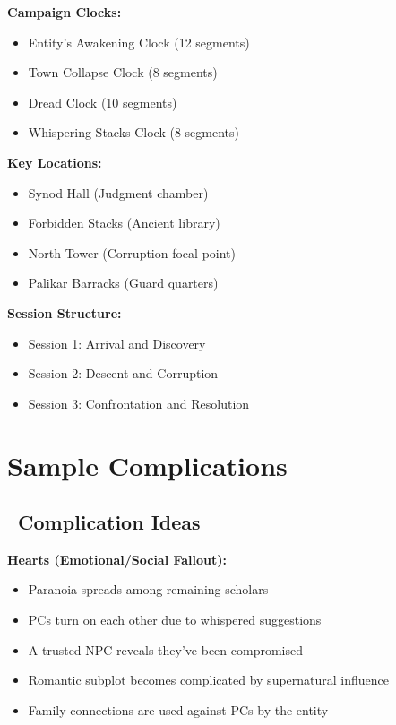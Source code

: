 \documentclass[11pt]{article}
\begin{document}
\textbf{Campaign Clocks:}
\begin{itemize}
    \item Entity's Awakening Clock (12 segments)
    \item Town Collapse Clock (8 segments)
    \item Dread Clock (10 segments)
    \item Whispering Stacks Clock (8 segments)
\end{itemize}

\textbf{Key Locations:}
\begin{itemize}
    \item Synod Hall (Judgment chamber)
    \item Forbidden Stacks (Ancient library)
    \item North Tower (Corruption focal point)
    \item Palikar Barracks (Guard quarters)
\end{itemize}

\textbf{Session Structure:}
\begin{itemize}
    \item Session 1: Arrival and Discovery
    \item Session 2: Descent and Corruption
    \item Session 3: Confrontation and Resolution
\end{itemize}

\section{Sample Complications}

\subsection*{\faBolt\ Complication Ideas}

\textbf{Hearts (Emotional/Social Fallout):}
\begin{itemize}
    \item Paranoia spreads among remaining scholars
    \item PCs turn on each other due to whispered suggestions
    \item A trusted NPC reveals they've been compromised
    \item Romantic subplot becomes complicated by supernatural influence
    \item Family connections are used against PCs by the entity
\end{itemize}
\end{document}
